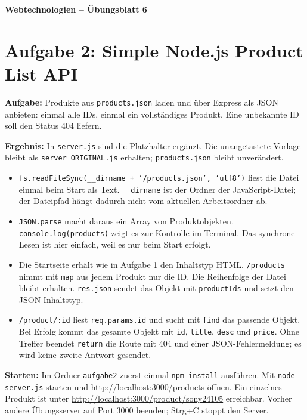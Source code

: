 \documentclass[11pt,a4paper]{article}
\begin{document}
\begin{center}
  {\Large\textbf{Webtechnologien -- Übungsblatt 6}}
\end{center}
\section*{Aufgabe 2: Simple Node.js Product List API}
\textbf{Aufgabe:} Produkte aus \texttt{products.json} laden und über
Express als JSON anbieten: einmal alle IDs, einmal ein vollständiges
Produkt. Eine unbekannte ID soll den Status 404 liefern.

\medskip
\textbf{Ergebnis:} In \texttt{server.js} sind die Platzhalter ergänzt.
Die unangetastete Vorlage bleibt als \texttt{server\_ORIGINAL.js} erhalten;
\texttt{products.json} bleibt unverändert.
\begin{itemize}
  \item \texttt{fs.readFileSync(\_\_dirname + '/products.json', 'utf8')}
    liest die Datei einmal beim Start als Text. \texttt{\_\_dirname} ist
    der Ordner der JavaScript-Datei; der Dateipfad hängt dadurch nicht
    vom aktuellen Arbeitsordner ab.
  \item \texttt{JSON.parse} macht daraus ein Array von Produktobjekten.
    \texttt{console.log(products)} zeigt es zur Kontrolle im Terminal.
    Das synchrone Lesen ist hier einfach, weil es nur beim Start erfolgt.
  \item Die Startseite erhält wie in Aufgabe 1 den Inhaltstyp HTML.
    \texttt{/products} nimmt mit \texttt{map} aus jedem Produkt nur die ID.
    Die Reihenfolge der Datei bleibt erhalten. \texttt{res.json} sendet
    das Objekt mit \texttt{productIds} und setzt den JSON-Inhaltstyp.
  \item \texttt{/product/:id} liest \texttt{req.params.id} und sucht
    mit \texttt{find} das passende Objekt. Bei Erfolg kommt das gesamte
    Objekt mit \texttt{id}, \texttt{title}, \texttt{desc} und \texttt{price}.
    Ohne Treffer beendet \texttt{return} die Route mit 404 und einer
    JSON-Fehlermeldung; es wird keine zweite Antwort gesendet.
\end{itemize}

\textbf{Starten:} Im Ordner \texttt{aufgabe2} zuerst einmal
\texttt{npm install} ausführen.
Mit \texttt{node server.js} starten und
\url{http://localhost:3000/products} öffnen. Ein einzelnes Produkt ist unter
\url{http://localhost:3000/product/sony24105} erreichbar.
Vorher andere Übungsserver auf Port 3000 beenden; Strg+C stoppt den Server.
\end{document}
